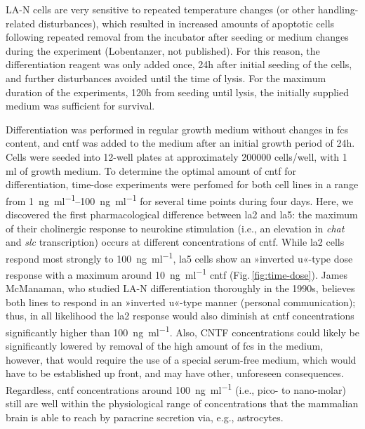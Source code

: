 \begin{method}
LA-N cells are very sensitive to repeated temperature changes (or other handling-related disturbances), which resulted in increased amounts of apoptotic cells following repeated removal from the incubator after seeding or medium changes during the experiment (Lobentanzer, not published). For this reason, the differentiation reagent was only added once, 24h after initial seeding of the cells, and further disturbances avoided until the time of lysis. For the maximum duration of the experiments, 120h from seeding until lysis, the initially supplied medium was sufficient for survival.

Differentiation was performed in regular growth medium without changes in \ac{fcs} content, and \ac{cntf} was added to the medium after an initial growth period of 24h. Cells were seeded into 12-well plates at approximately \num{200000} cells/well, with 1 ml of growth medium. To determine the optimal amount of \ac{cntf} for differentiation, time-dose experiments were perfomed for both cell lines in a range from \SIrange{1}{100}{\nano\gram\per\milli\litre} for several time points during four days. Here, we discovered the first pharmacological difference between \ac{la2} and \ac{la5}: the maximum of their cholinergic response to neurokine stimulation (i.e., an elevation in \textit{\ac{chat}} and \textit{\ac{slc}} transcription) occurs at different concentrations of \ac{cntf}. While \ac{la2} cells respond most strongly to \SI{100}{\nano\gram\per\milli\litre}, \ac{la5} cells show an »inverted u«-type dose response with a maximum around \SI{10}{\nano\gram\per\milli\litre} \ac{cntf} (Fig.\,\ref{fig:time-dose}). James McManaman, who studied LA-N differentiation thoroughly in the 1990s,\cite{McManaman1991} believes both lines to respond in an »inverted u«-type manner (personal communication); thus, in all likelihood the \ac{la2} response would also diminish at \ac{cntf} concentrations significantly higher than \SI{100}{\nano\gram\per\milli\litre}. Also, CNTF concentrations could likely be significantly lowered by removal of the high amount of \ac{fcs} in the medium, however, that would require the use of a special serum-free medium, which would have to be established up front, and may have other, unforeseen consequences. Regardless, \ac{cntf} concentrations around \SI{100}{\nano\gram\per\milli\litre} (i.e., pico- to nano-molar) still are well within the physiological range of concentrations that the mammalian brain is able to reach by paracrine secretion via, e.g., astrocytes.\cite{Sun2016}

\end{method}

